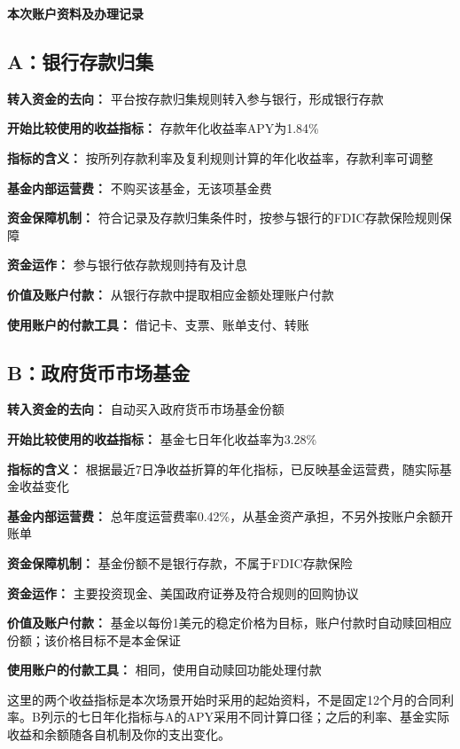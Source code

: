 \documentclass[UTF8,fontset=none,11pt,a4paper]{ctexart}
\begin{document}
{\noindent\fontsize{20}{25}\selectfont\bfseries 本次账户资料及办理记录\par}
\vspace{10pt}
\subsection*{A：银行存款归集}
\textbf{转入资金的去向：} 平台按存款归集规则转入参与银行，形成银行存款


\textbf{开始比较使用的收益指标：} 存款年化收益率APY为1.84\%


\textbf{指标的含义：} 按所列存款利率及复利规则计算的年化收益率，存款利率可调整


\textbf{基金内部运营费：} 不购买该基金，无该项基金费


\textbf{资金保障机制：} 符合记录及存款归集条件时，按参与银行的FDIC存款保险规则保障


\textbf{资金运作：} 参与银行依存款规则持有及计息


\textbf{价值及账户付款：} 从银行存款中提取相应金额处理账户付款


\textbf{使用账户的付款工具：} 借记卡、支票、账单支付、转账


\subsection*{B：政府货币市场基金}
\textbf{转入资金的去向：} 自动买入政府货币市场基金份额


\textbf{开始比较使用的收益指标：} 基金七日年化收益率为3.28\%


\textbf{指标的含义：} 根据最近7日净收益折算的年化指标，已反映基金运营费，随实际基金收益变化


\textbf{基金内部运营费：} 总年度运营费率0.42\%，从基金资产承担，不另外按账户余额开账单


\textbf{资金保障机制：} 基金份额不是银行存款，不属于FDIC存款保险


\textbf{资金运作：} 主要投资现金、美国政府证券及符合规则的回购协议


\textbf{价值及账户付款：} 基金以每份1美元的稳定价格为目标，账户付款时自动赎回相应份额；该价格目标不是本金保证


\textbf{使用账户的付款工具：} 相同，使用自动赎回功能处理付款


这里的两个收益指标是本次场景开始时采用的起始资料，不是固定12个月的合同利率。B列示的七日年化指标与A的APY采用不同计算口径；之后的利率、基金实际收益和余额随各自机制及你的支出变化。
\end{document}
